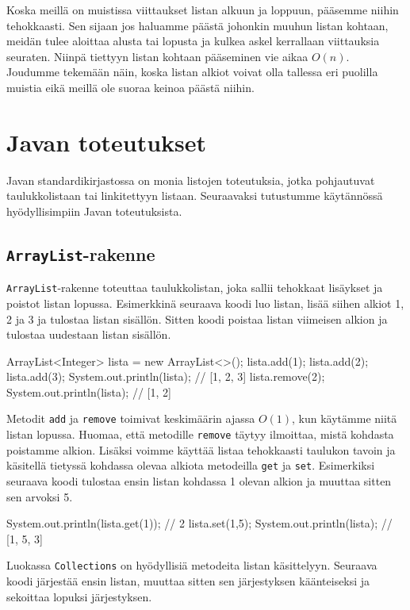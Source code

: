Koska meillä on muistissa viittaukset listan alkuun ja loppuun,
pääsemme niihin tehokkaasti.
Sen sijaan jos haluamme päästä johonkin muuhun listan kohtaan,
meidän tulee aloittaa alusta tai lopusta ja kulkea askel
kerrallaan viittauksia seuraten.
Niinpä tiettyyn listan kohtaan pääseminen vie aikaa $O(n)$.
Joudumme tekemään näin, koska listan alkiot voivat olla
tallessa eri puolilla muistia eikä meillä ole suoraa keinoa
päästä niihin.

\section{Javan toteutukset}

Javan standardikirjastossa on monia listojen toteutuksia,
jotka pohjautuvat taulukkolistaan tai linkitettyyn listaan.
Seuraavaksi tutustumme käytännössä hyödyllisimpiin
Javan toteutuksista.

\subsection{\texttt{ArrayList}-rakenne}

\texttt{ArrayList}-rakenne toteuttaa taulukkolistan,
joka sallii tehokkaat lisäykset ja poistot listan lopussa.
Esimerkkinä seuraava koodi luo listan, lisää siihen alkiot
1, 2 ja 3 ja tulostaa listan sisällön.
Sitten koodi poistaa listan viimeisen alkion ja
tulostaa uudestaan listan sisällön.

\begin{code}
ArrayList<Integer> lista = new ArrayList<>();
lista.add(1);
lista.add(2);
lista.add(3);
System.out.println(lista); // [1, 2, 3]
lista.remove(2);
System.out.println(lista); // [1, 2]
\end{code}

Metodit \texttt{add} ja \texttt{remove}
toimivat keskimäärin ajassa $O(1)$,
kun käytämme niitä listan lopussa.
Huomaa, että metodille \texttt{remove} täytyy ilmoittaa,
mistä kohdasta poistamme alkion.
Lisäksi voimme käyttää listaa tehokkaasti taulukon tavoin
ja käsitellä tietyssä kohdassa olevaa alkiota
metodeilla \texttt{get} ja \texttt{set}.
Esimerkiksi seuraava koodi tulostaa ensin
listan kohdassa 1 olevan alkion ja muuttaa sitten
sen arvoksi 5.

\begin{code}
System.out.println(lista.get(1)); // 2
lista.set(1,5);
System.out.println(lista); // [1, 5, 3]
\end{code}

Luokassa \texttt{Collections} on hyödyllisiä metodeita
listan käsittelyyn.
Seuraava koodi järjestää ensin listan,
muuttaa sitten sen järjestyksen käänteiseksi
ja sekoittaa lopuksi järjestyksen.

